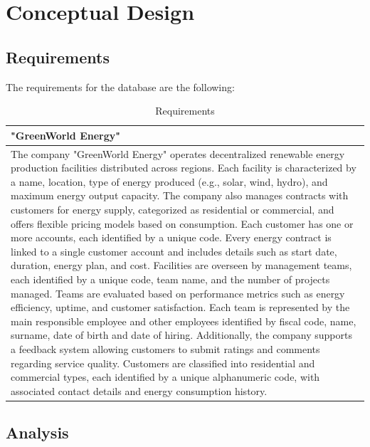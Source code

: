 \section{Conceptual Design}
\subsection{Requirements}
The requirements for the database are the following:
\begin{table}[H]
    \renewcommand{\arraystretch}{1.3} %
    \begin{tabularx}{\textwidth}{|X|}
    \hline
    \textbf{"GreenWorld Energy"} \\ \hline
    The company "GreenWorld Energy" operates decentralized renewable energy production facilities distributed 
across regions. Each facility is characterized by a name, location, type of energy produced (e.g., solar, wind, 
hydro), and maximum energy output capacity. The company also manages contracts with customers for energy 
supply, categorized as residential or commercial, and offers flexible pricing models based on consumption. 
Each customer has one or more accounts, each identified by a unique code. Every energy contract is linked to a 
single customer account and includes details such as start date, duration, energy plan, and cost. Facilities are 
overseen by management teams, each identified by a unique code, team name, and the number of projects managed. 
Teams are evaluated based on performance metrics such as energy efficiency, uptime, and customer satisfaction. 
Each team is represented by the main responsible employee and other employees identified by fiscal code, name, 
surname, date of birth and date of hiring. Additionally, the company supports a feedback system allowing 
customers to submit ratings and comments regarding service quality. Customers are classified into residential and 
commercial types, each identified by a unique alphanumeric code, with associated contact details and energy 
consumption history. \\ \hline
    \end{tabularx}
    \caption{Requirements}
    \end{table}


\subsection{Analysis}

